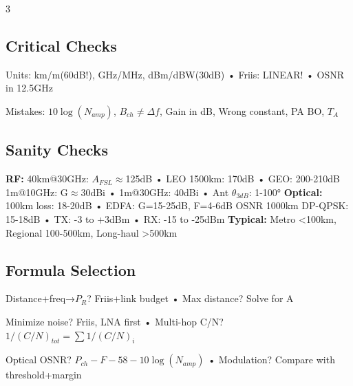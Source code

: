 \documentclass[a4paper,6pt]{extarticle}
\begin{document}
\begin{multicols}{3}
\subsection*{Critical Checks}
Units: km/m(60dB!), GHz/MHz, dBm/dBW(30dB) • Friis: LINEAR! • OSNR in 12.5GHz

Mistakes: $10\log(N_{amp})$, $B_{ch} \neq \Delta f$, Gain in dB, Wrong constant, PA BO, $T_A$

\subsection*{Sanity Checks}
\textbf{RF:} 40km@30GHz: $A_{FSL}\approx$125dB • LEO 1500km: 170dB • GEO: 200-210dB
1m@10GHz: G$\approx$30dBi • 1m@30GHz: 40dBi • Ant $\theta_{3dB}$: 1-100°
\textbf{Optical:} 100km loss: 18-20dB • EDFA: G=15-25dB, F=4-6dB
OSNR 1000km DP-QPSK: 15-18dB • TX: -3 to +3dBm • RX: -15 to -25dBm
\textbf{Typical:} Metro <100km, Regional 100-500km, Long-haul >500km

\subsection*{Formula Selection}
Distance+freq→$P_R$? Friis+link budget • Max distance? Solve for A

Minimize noise? Friis, LNA first • Multi-hop C/N? $1/(C/N)_{tot}=\sum 1/(C/N)_i$

Optical OSNR? $P_{ch}-F-58-10\log(N_{amp})$ • Modulation? Compare with threshold+margin

\end{multicols}
\end{document}
